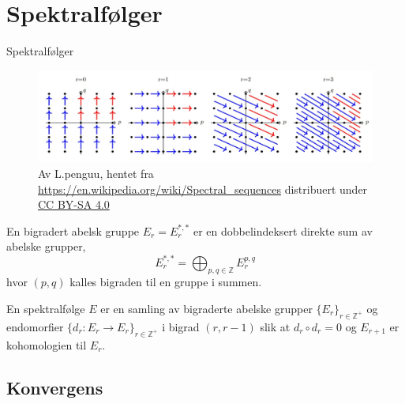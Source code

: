 \documentclass[UKenglish]{beamer}
\begin{document}
\section{Spektralfølger}
\SectionPage


\begin{frame}{Spektralfølger}
    \begin{figure}[]
        \centering
        \includegraphics[width=\textwidth]{figures/specseq.jpg}
        \caption{Av L.penguu, hentet fra \href{https://en.wikipedia.org/wiki/Spectral_sequences}{https://en.wikipedia.org/wiki/Spectral\_sequences} distribuert under \href{https://creativecommons.org/licenses/by-sa/4.0/}{CC BY-SA 4.0}}
        \label{fig:}
    \end{figure}
\end{frame}

\begin{frame}
   \begin{definition}
      En bigradert abelsk gruppe \( E_r = E_r^{*,*} \) er en dobbelindeksert 
      direkte sum av abelske grupper,
      \begin{equation}
          E_r^{*,*} = \bigoplus_{p,q\in\mathbb{Z}} E_r^{p,q}
      \end{equation}
        hvor \( (p, q) \) kalles bigraden til en gruppe i summen.
   \end{definition} 
    \pause

    \begin{definition}[Spektralfølge]
        En spektralfølge \( E \) er en samling av bigraderte
        abelske grupper \(\{E_r\}_{r\in\mathbb{Z}^+}  \) og endomorfier 
        \( \{d_r:E_r\rightarrow E_r\}_{r\in\mathbb{Z}^+} \) i bigrad \( (r, r-1) \) slik at
        \( d_r\circ d_r =0 \) og \( E_{r+1} \) er kohomologien til
        \( E_r \).
    \end{definition}
\end{frame}


\subsection{Konvergens}
\end{document}
